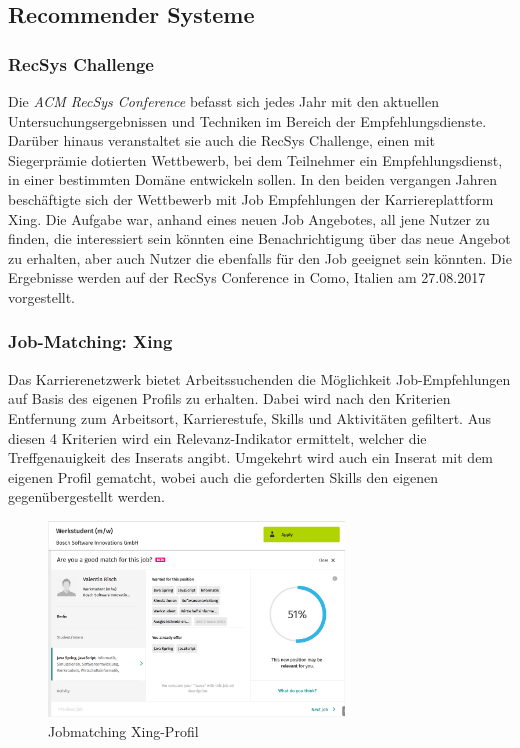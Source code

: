\subsection{Recommender Systeme}



\subsubsection{RecSys Challenge}

Die \textit{ACM RecSys Conference} befasst sich jedes Jahr mit den aktuellen Untersuchungsergebnissen und Techniken im Bereich der Empfehlungsdienste. Darüber hinaus veranstaltet sie auch die RecSys Challenge, einen mit  Siegerprämie dotierten Wettbewerb, bei dem Teilnehmer ein Empfehlungsdienst, in einer bestimmten Domäne entwickeln sollen. In den beiden vergangen Jahren beschäftigte sich der Wettbewerb mit Job Empfehlungen der Karriereplattform Xing. Die Aufgabe war, anhand eines neuen Job Angebotes, all jene Nutzer zu finden, die interessiert sein könnten eine Benachrichtigung über das neue Angebot zu erhalten, aber auch Nutzer die ebenfalls für den Job geeignet sein könnten. Die Ergebnisse werden auf der RecSys Conference in Como, Italien am 27.08.2017 vorgestellt.
\subsubsection{Job-Matching: Xing}

Das Karrierenetzwerk bietet Arbeitssuchenden die Möglichkeit Job-Empfehlungen auf Basis des eigenen Profils zu erhalten. Dabei wird nach den Kriterien Entfernung zum Arbeitsort, Karrierestufe, Skills und Aktivitäten gefiltert. Aus diesen 4 Kriterien wird ein Relevanz-Indikator ermittelt, welcher die Treffgenauigkeit des Inserats angibt. Umgekehrt wird auch ein Inserat mit dem eigenen Profil gematcht, wobei auch die geforderten Skills den eigenen gegenübergestellt werden.\cite{hoelscher}

\begin{figure}[htb]
 \centering
 \includegraphics[width=0.7\textwidth,angle=0]{abb/xing_jobmatching}
 \caption[Beschreibung]{Jobmatching Xing-Profil}
\label{fig:Beschreibung}
\end{figure}

